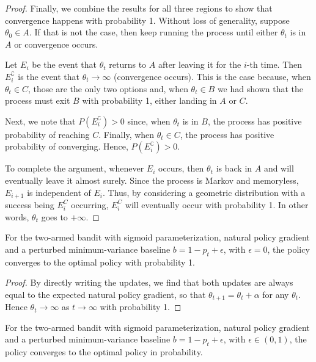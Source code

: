 \begin{proof}
Finally, we combine the results for all three regions to show that convergence happens with probability 1.
Without loss of generality, suppose $\theta_0 \in A$. If that is not the case, then keep running the process until either $\theta_t$ is in $A$ or convergence occurs. 

Let $E_i$ be the event that $\theta_t$ returns to $A$ after leaving it for the $i$-th time. Then $E_i^\complement$ is the event that $\theta_t \xrightarrow{} \infty$ (convergence occurs).
This is the case because, when $\theta_t \in C$, those are the only two options and, when $\theta_t \in B$ we had shown that the process must exit $B$ with probability 1, either landing in $A$ or $C$.

Next, we note that $P(E_i^\complement) > 0$ since, when $\theta_t$ is in $B$, the process has positive probability of reaching $C$. Finally, when $\theta_t \in C$, the process has positive probability of converging. Hence, $P(E_i^\complement) > 0$. 

To complete the argument, whenever $E_i$ occurs, then $\theta_t$ is back in $A$ and will eventually leave it almost surely. Since the process is Markov and memoryless, $E_{i+1}$ is independent of $E_i$. 
Thus, by considering a geometric distribution with a success being $E^C_i$ occurring, $E_i^C$ will eventually occur with probability 1. In other words, $\theta_t$ goes to $+\infty$.

\end{proof}

\begin{lemma}
\label{lem:prop_epsilon_0}
For the two-armed bandit with sigmoid parameterization, natural policy gradient and a perturbed minimum-variance baseline $b = 1-p_t +\epsilon$, with $\epsilon=0$, the policy converges to the optimal policy with probability 1.
\end{lemma}
\begin{proof}
    By directly writing the updates, we find that both updates are always equal to the expected natural policy gradient, so that $\theta_{t+1} = \theta_t + \alpha$ for any $\theta_t$. 
    Hence $\theta_t \xrightarrow{} \infty$ as $t \xrightarrow{} \infty$ with probability 1. 
\end{proof}

\begin{lemma}
\label{lem:prop_epsilon_01}
For the two-armed bandit with sigmoid parameterization, natural policy gradient and a perturbed minimum-variance baseline $b = 1-p_t +\epsilon$, with $\epsilon \in (0,1)$, the policy converges to the optimal policy in probability.
\end{lemma}

